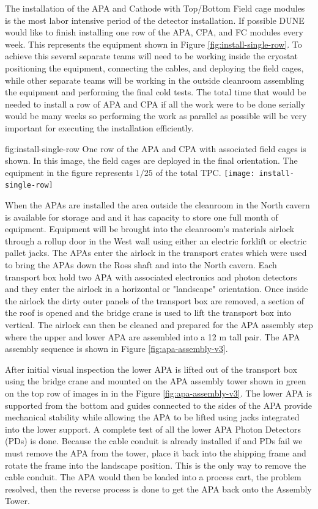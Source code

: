 The installation of the APA and Cathode with Top/Bottom Field cage modules is the most labor intensive period of the detector installation. If possible DUNE would like to finish installing one row of the APA, CPA, and FC modules every week. This represents the equipment shown in Figure \ref{fig:install-single-row}. To achieve this several separate teams will need to be working inside the cryostat positioning the equipment, connecting the cables, and deploying the field cages, while  other separate teams will be working in the outside cleanroom assembling the equipment and performing the final cold tests. The total time that would be needed to install a row of APA and CPA if all the work were to be done serially would be many weeks so performing the work as parallel  as possible will be very important for executing the installation efficiently. 


\begin{dunefigure}{fig:install-single-row}
{One row of the APA and CPA with associated field cages is shown. In this  image, the field cages are deployed in the final orientation. The equipment in the figure represents $1/25$ of the total TPC.}
 \texttt{[image: install-single-row]}
\end{dunefigure}

When the APAs are installed the area outside the cleanroom in the North cavern is available for storage and and it has capacity to store one full month of equipment. 
Equipment will be brought into the cleanroom's materials airlock through a rollup door in the West wall using either an electric forklift or electric pallet jacks.  
The APAs enter the airlock in the transport crates which were used to bring the APAs down the Ross shaft and into the North cavern. 
Each transport box hold two APA with associated electronics and photon detectors and they enter the airlock in a horizontal or "landscape" orientation. 
Once inside the airlock the dirty outer panels of the transport box are removed, a section of the roof is opened and the bridge crane is used to lift the transport box into vertical. 
The airlock can then be cleaned and prepared for the APA assembly step where the upper and lower APA are assembled into a 12 \si{m} tall pair.
The APA assembly sequence is shown in Figure \ref{fig:apa-assembly-v3}.

After initial visual inspection the lower APA is lifted out of the transport box 
using the bridge crane and mounted on the APA assembly tower shown in green on the top row of images in in the Figure \ref{fig:apa-assembly-v3}. 
The  lower APA is supported from the bottom and guides connected to the sides of the APA provide mechanical stability while allowing the APA to be lifted using jacks integrated into the lower support. A complete test of all the lower APA Photon Detectors (PDs) is done.  Because the cable conduit is already installed if and PDs fail we must remove the APA from the tower, place it back into the shipping frame and rotate the frame into the landscape position.  This is the only way to remove the cable conduit. The APA would then be loaded into a process cart, the problem resolved, then the reverse process is done to get the APA back onto the Assembly Tower. 

